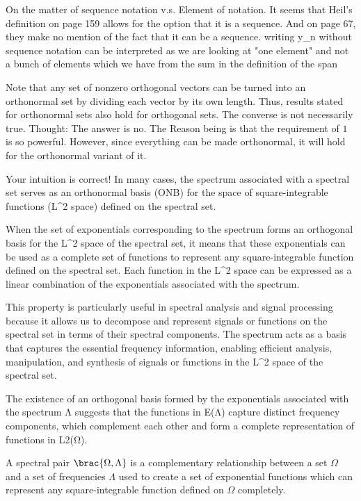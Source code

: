 



On the matter of sequence notation v.s. Element of notation. It seems that Heil's definition on page 159 allows for the option that it is a sequence. And on page 67, they make no mention of the fact that it can be a sequence.
writing y_n without sequence notation can be interpreted as we are looking at "one element" and not a bunch of elements which we have from the sum in the definition of the span


Note that any set of nonzero orthogonal vectors can be turned into an orthonormal set by dividing each vector by its own length. 
Thus, results stated for orthonormal sets also hold for orthogonal sets. The converse is not necessarily true.
Thought: The answer is no. The Reason being is that the requirement of $1$ is so powerful. However, since everything can be made orthonormal, it will hold for the orthonormal variant of it. 



Your intuition is correct! In many cases, the spectrum associated with a spectral set serves as an orthonormal basis (ONB) for the space of square-integrable functions (L^2 space) defined on the spectral set.

When the set of exponentials corresponding to the spectrum forms an orthogonal basis for the L^2 space of the spectral set, it means that these exponentials can be used as a complete set of functions to represent any square-integrable function defined on the spectral set. Each function in the L^2 space can be expressed as a linear combination of the exponentials associated with the spectrum.

This property is particularly useful in spectral analysis and signal processing because it allows us to decompose and represent signals or functions on the spectral set in terms of their spectral components. The spectrum acts as a basis that captures the essential frequency information, enabling efficient analysis, manipulation, and synthesis of signals or functions in the L^2 space of the spectral set.

The existence of an orthogonal basis formed by the exponentials associated with the spectrum Λ suggests that the functions in E(Λ) capture distinct frequency components, which complement each other and form a complete representation of functions in L2(Ω).

A spectral pair $\brac{\Omega,\Lambda}$ is a complementary relationship between a set $\Omega$ and a set of frequencies $\Lambda$ used to create a set of exponential functions which can represent any square-integrable function defined on $\Omega$ completely. 